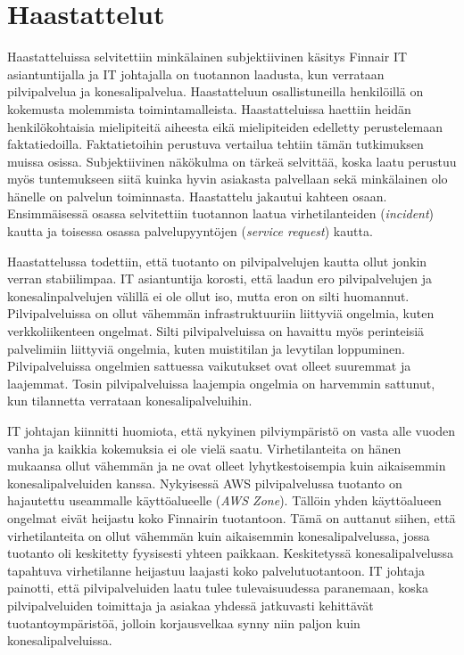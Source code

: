 \section{Haastattelut}
Haastatteluissa selvitettiin minkälainen subjektiivinen käsitys Finnair IT asiantuntijalla ja IT johtajalla on tuotannon laadusta, kun verrataan pilvipalvelua ja konesalipalvelua. Haastatteluun osallistuneilla henkilöillä on kokemusta molemmista toimintamalleista. Haastatteluissa haettiin heidän henkilökohtaisia mielipiteitä aiheesta eikä mielipiteiden edelletty perustelemaan faktatiedoilla. Faktatietoihin perustuva vertailua tehtiin tämän tutkimuksen muissa osissa. Subjektiivinen näkökulma on tärkeä selvittää, koska laatu perustuu myös tuntemukseen siitä kuinka hyvin asiakasta palvellaan sekä minkälainen olo hänelle on palvelun toiminnasta. Haastattelu jakautui kahteen osaan. Ensimmäisessä osassa selvitettiin tuotannon laatua virhetilanteiden (\emph{incident}) kautta ja toisessa osassa palvelupyyntöjen (\emph{service request}) kautta.

Haastattelussa todettiin, että tuotanto on pilvipalvelujen kautta ollut jonkin verran stabiilimpaa. IT asiantuntija korosti, että laadun ero pilvipalvelujen ja konesalinpalvelujen välillä ei ole ollut iso, mutta eron on silti huomannut. Pilvipalveluissa on ollut vähemmän infrastruktuuriin liittyviä ongelmia, kuten verkkoliikenteen ongelmat. Silti pilvipalveluissa on havaittu myös perinteisiä palvelimiin liittyviä ongelmia, kuten muistitilan ja levytilan loppuminen. Pilvipalveluissa ongelmien sattuessa vaikutukset ovat olleet suuremmat ja laajemmat. Tosin pilvipalveluissa laajempia ongelmia on harvemmin sattunut, kun tilannetta verrataan konesalipalveluihin.

IT johtajan kiinnitti huomiota, että nykyinen pilviympäristö on vasta alle vuoden vanha ja kaikkia kokemuksia ei ole vielä saatu. Virhetilanteita on hänen mukaansa ollut vähemmän ja ne ovat olleet lyhytkestoisempia kuin aikaisemmin konesalipalveluiden kanssa. Nykyisessä AWS pilvipalvelussa tuotanto on hajautettu useammalle käyttöalueelle (\emph{AWS Zone}). Tällöin yhden käyttöalueen ongelmat eivät heijastu koko Finnairin tuotantoon. Tämä on auttanut siihen, että virhetilanteita on ollut vähemmän kuin aikaisemmin konesalipalvelussa, jossa tuotanto oli keskitetty fyysisesti yhteen paikkaan. Keskitetyssä konesalipalvelussa tapahtuva virhetilanne heijastuu laajasti koko palvelutuotantoon. IT johtaja painotti, että pilvipalveluiden laatu tulee tulevaisuudessa paranemaan, koska pilvipalveluiden toimittaja ja asiakaa yhdessä jatkuvasti kehittävät tuotantoympäristöä, jolloin korjausvelkaa synny niin paljon kuin konesalipalveluissa.

